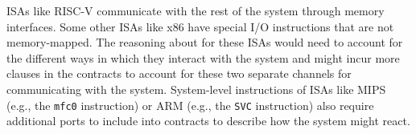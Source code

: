 ISAs like RISC-V communicate with the rest of the system through memory interfaces.
Some other ISAs like x86 have special I/O instructions that are not memory-mapped.
The reasoning about \pics for these ISAs would need to account for the different ways in which they interact with the system and might incur more clauses in the contracts to account for these two separate channels for communicating with the system.
System-level instructions of ISAs like MIPS~\cite{mips_isa} (e.g., the \texttt{mfc0} instruction) or ARM (e.g., the \texttt{SVC} instruction) also require additional ports to include into contracts to describe how the system might react.
